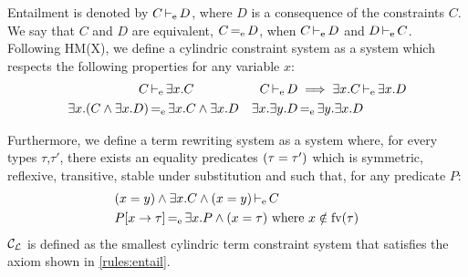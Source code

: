 Entailment is denoted by $\entail{C}{D}$,
where $D$ is a consequence of the constraints $C$.
We say that $C$ and $D$ are equivalent, $C \equivC D$,
when $\entail{C}{D}$ and $\entail{D}{C}$.
%
Following HM(X), we define a cylindric constraint system as
a system which respects the following properties for any variable $x$:
\begin{align*}
  \entail{C&}{\Cproj{x}{C}}
  &\entail{C}{D} &\implies \entail{\Cproj{x}C}{\Cproj{x}D}\\
  \Cproj{x}{(C\wedge \Cproj{x}D)}&\equivC \Cproj{x}{C} \wedge \Cproj{x}D
  & \Cproj{x}{\Cproj{y}D}&\equivC \Cproj{y}{\Cproj{x}D}
\end{align*}

Furthermore, we define a term rewriting system as a system where, for every
types $\tau$,$\tau'$, there exists an equality predicates $\Ceq{\tau}{\tau'}$
which is symmetric, reflexive, transitive, stable under substitution and such that,
for any predicate $P$:
\begin{align*}
  &\entail{\Ceq{x}{y}\wedge \Cproj{x}C \wedge \Ceq{x}{y}}{C}\\
  &\subst{x}{\tau}{P} \equivC \Cproj{x}P \wedge \Ceq{x}{\tau}
                        \text{ where } x\notin\fv{\tau}
\end{align*}
$\CL$ is defined as the smallest cylindric term constraint system that
satisfies the axiom shown in \cref{rules:entail}.

